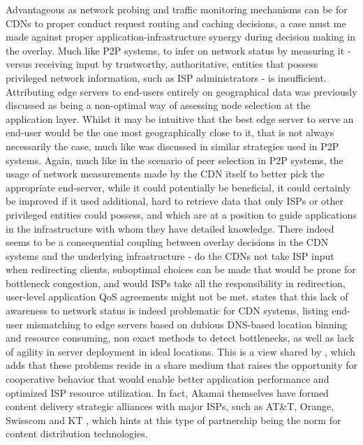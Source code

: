     Advantageous as network probing and traffic monitoring mechanisms can be for CDNs to proper conduct request routing and caching decisions, a case must me made against proper application-infrastructure synergy during decision making in the overlay.
    Much like P2P systems, to infer on network status by measuring it - versus receiving input by trustworthy, authoritative, entities that possess privileged network information, such as ISP administrators - is insufficient.
    Attributing edge servers to end-users entirely on geographical data was previously discussed as being a non-optimal way of assessing node selection at the application layer.
    Whilst it may be intuitive that the best edge server to serve an end-user would be the one most geographically close to it, that is not always necessarily the case, much like was discussed in similar strategies used in P2P systems.
    Again, much like in the scenario of peer selection in P2P systems, the usage of network measurements made by the CDN itself to better pick the appropriate end-server, while it could potentially be beneficial, it could certainly be improved if it used additional, hard to retrieve data that only ISPs or other privileged entities could possess, and which are at a position to guide applications in the infrastructure with whom they have detailed knowledge.
    There indeed seems to be a consequential coupling between overlay decisions in the CDN systems and the underlying infrastructure - do the CDNs not take ISP input when redirecting clients, suboptimal choices can be made that would be prone for bottleneck congestion, and would ISPs take all the responsibility in redirection, user-level application QoS agreements might not be met.
        \cite{pushing-cdn-isp-collaboration} states that this lack of awareness to network status is indeed problematic for CDN systems, listing end-user mismatching to edge servers based on dubious DNS-based location binning and resource consuming, non exact methods to detect bottlenecks, as well as lack of agility in server deployment in ideal locations.
        This is a view shared by \cite{cdn-isp-cooperations}, which adds that these problems reside in a share medium that raises the opportunity for cooperative behavior that would enable better application performance and optimized ISP resource utilization.
        In fact, Akamai themselves have formed content delivery strategic alliances with major ISPs, such as AT\&T, Orange, Swisscom and KT \cite{pushing-cdn-isp-collaboration}, which hints at this type of partnership being the norm for content distribution technologies.

